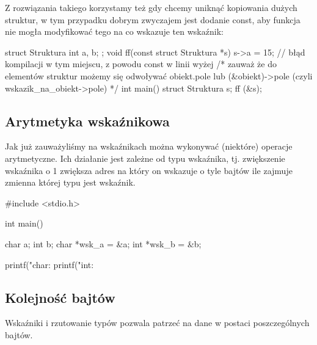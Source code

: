 Z rozwiązania takiego korzystamy też gdy chcemy uniknąć kopiowania dużych struktur, w tym przypadku dobrym zwyczajem jest dodanie const, aby funkcja nie mogła modyfikować tego na co wskazuje ten wskaźnik:

\begin{CodeFrame*}[c]{}
struct Struktura {
  int a, b;
};
void ff(const struct Struktura *s) {
    s->a = 15; // błąd kompilacji w tym miejscu, z powodu const w linii wyżej
    /* zauważ że do elementów struktur możemy się odwoływać
       obiekt.pole lub (&obiekt)->pole (czyli wskazik_na_obiekt->pole) */
}
int main() {
    struct Struktura s;
    ff (&s);
}
\end{CodeFrame*}


\subsection{Arytmetyka wskaźnikowa}

Jak już zauważyliśmy na wskaźnikach można wykonywać (niektóre) operacje arytmetyczne. Ich działanie jest zależne od typu wskaźnika, tj. zwiększenie wskaźnika o 1 zwiększa adres na który on wskazuje o tyle bajtów ile zajmuje zmienna której typu jest wskaźnik.

\begin{CodeFrame*}[c]{}
#include <stdio.h>

int main() {
    char a;    int    b;
    char *wsk_a = &a;
    int    *wsk_b = &b;
    
    printf("char: %
    printf("int:    %
}
\end{CodeFrame*}

\subsection{Kolejność bajtów }

Wskaźniki i rzutowanie typów pozwala patrzeć na dane w postaci poszczególnych bajtów.


